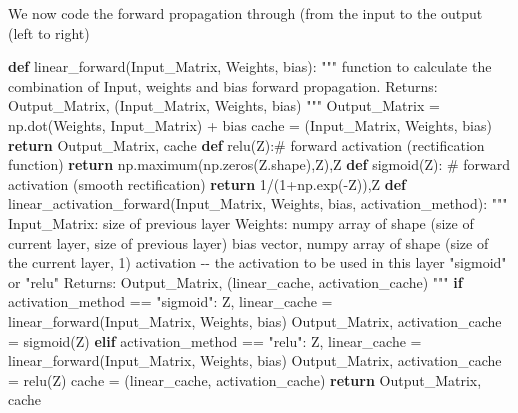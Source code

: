 \documentclass[
  letterpaper,
  DIV=11,
  numbers=noendperiod]{scrartcl}
\newenvironment{Shaded}{\begin{snugshade}}{\end{snugshade}}
\newcommand{\CommentTok}[1]{\textcolor[rgb]{0.37,0.37,0.37}{#1}}
\newcommand{\ControlFlowTok}[1]{\textcolor[rgb]{0.00,0.23,0.31}{\textbf{#1}}}
\newcommand{\DecValTok}[1]{\textcolor[rgb]{0.68,0.00,0.00}{#1}}
\newcommand{\KeywordTok}[1]{\textcolor[rgb]{0.00,0.23,0.31}{\textbf{#1}}}
\newcommand{\NormalTok}[1]{\textcolor[rgb]{0.00,0.23,0.31}{#1}}
\newcommand{\OperatorTok}[1]{\textcolor[rgb]{0.37,0.37,0.37}{#1}}
\newcommand{\StringTok}[1]{\textcolor[rgb]{0.13,0.47,0.30}{#1}}
\begin{document}
We now code the forward propagation through (from the input to the
output (left to right)

\begin{Shaded}
\begin{Highlighting}[]
\KeywordTok{def}\NormalTok{ linear\_forward(Input\_Matrix, Weights, bias):}
    \CommentTok{"""}
\CommentTok{    function to calculate the combination of Input, weights and bias}
\CommentTok{    forward propagation.}
\CommentTok{    Returns: Output\_Matrix, (Input\_Matrix, Weights, bias)}
\CommentTok{    """}
\NormalTok{    Output\_Matrix }\OperatorTok{=}\NormalTok{ np.dot(Weights, Input\_Matrix) }\OperatorTok{+}\NormalTok{ bias}
\NormalTok{    cache }\OperatorTok{=}\NormalTok{ (Input\_Matrix, Weights, bias)}
    \ControlFlowTok{return}\NormalTok{ Output\_Matrix, cache}
\KeywordTok{def}\NormalTok{ relu(Z):}\CommentTok{\# forward activation (rectification function)}
    \ControlFlowTok{return}\NormalTok{ np.maximum(np.zeros(Z.shape),Z),Z}
\KeywordTok{def}\NormalTok{ sigmoid(Z): }\CommentTok{\# forward activation (smooth rectification)}
    \ControlFlowTok{return} \DecValTok{1}\OperatorTok{/}\NormalTok{(}\DecValTok{1}\OperatorTok{+}\NormalTok{np.exp(}\OperatorTok{{-}}\NormalTok{Z)),Z}
\KeywordTok{def}\NormalTok{ linear\_activation\_forward(Input\_Matrix, Weights, bias, activation\_method):}
    \CommentTok{"""}
\CommentTok{    Input\_Matrix: size of previous layer}
\CommentTok{    Weights: numpy array of shape (size of current layer, size of previous layer)}
\CommentTok{    bias vector, numpy array of shape (size of the current layer, 1)}
\CommentTok{    activation {-}{-} the activation to be used in this layer "sigmoid" or "relu"}
\CommentTok{    Returns: Output\_Matrix, (linear\_cache, activation\_cache)}
\CommentTok{    """}
    \ControlFlowTok{if}\NormalTok{ activation\_method }\OperatorTok{==} \StringTok{"sigmoid"}\NormalTok{:}
\NormalTok{        Z, linear\_cache }\OperatorTok{=}\NormalTok{ linear\_forward(Input\_Matrix, Weights, bias)}
\NormalTok{        Output\_Matrix, activation\_cache }\OperatorTok{=}\NormalTok{ sigmoid(Z)    }
    \ControlFlowTok{elif}\NormalTok{ activation\_method }\OperatorTok{==} \StringTok{"relu"}\NormalTok{:}
\NormalTok{        Z, linear\_cache }\OperatorTok{=}\NormalTok{ linear\_forward(Input\_Matrix, Weights, bias)}
\NormalTok{        Output\_Matrix, activation\_cache }\OperatorTok{=}\NormalTok{ relu(Z)    }
\NormalTok{    cache }\OperatorTok{=}\NormalTok{ (linear\_cache, activation\_cache)}
    \ControlFlowTok{return}\NormalTok{ Output\_Matrix, cache}
\end{Highlighting}
\end{Shaded}
\end{document}
